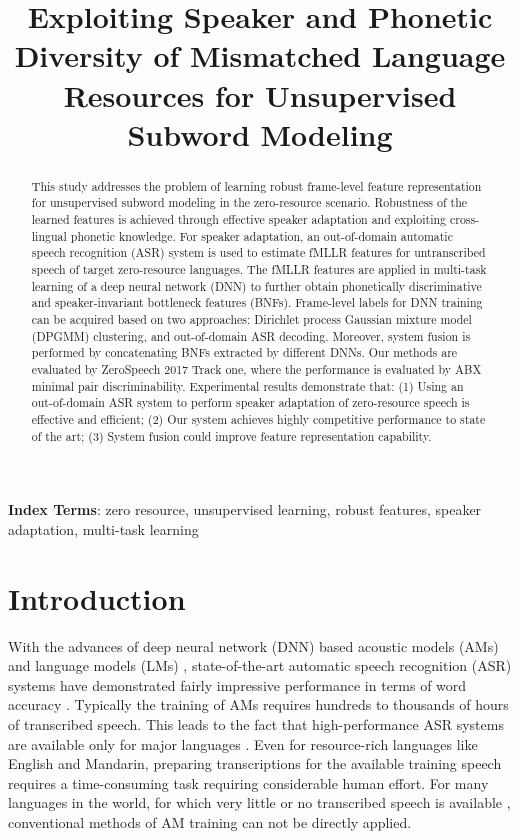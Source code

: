 \documentclass[a4paper]{article}
\title{Exploiting Speaker and Phonetic Diversity of Mismatched Language Resources for Unsupervised Subword Modeling}
\begin{document}
\maketitle
% 
\begin{abstract}
This study addresses the problem of learning robust frame-level feature representation for unsupervised subword modeling in the zero-resource scenario. Robustness of the learned features is achieved through effective speaker adaptation and exploiting cross-lingual phonetic knowledge. For speaker adaptation, an out-of-domain automatic speech recognition (ASR) system is used to estimate fMLLR features for untranscribed speech of target zero-resource languages. The fMLLR features  are applied in multi-task learning of a deep neural network (DNN) to further obtain phonetically discriminative and speaker-invariant bottleneck features (BNFs). Frame-level labels for DNN training can be acquired based on two approaches:  Dirichlet process Gaussian mixture model (DPGMM) clustering, and out-of-domain ASR decoding. Moreover, system fusion is performed by concatenating BNFs extracted by different DNNs. Our methods are evaluated by ZeroSpeech 2017 Track one, where the performance is evaluated by ABX minimal pair discriminability. Experimental results demonstrate that: (1) Using an out-of-domain ASR system to perform speaker adaptation of zero-resource speech is effective and efficient; (2) Our system achieves highly competitive performance to state of the art; (3) System fusion could improve feature representation capability.
\end{abstract}
\noindent\textbf{Index Terms}: zero resource, unsupervised learning, robust features, speaker adaptation, multi-task learning

\section{Introduction}
\label{sec:intro}
With the advances of deep neural network (DNN) based acoustic models (AMs) \cite{hinton2012deep} and language models (LMs) \cite{ragni2016multi}, state-of-the-art automatic speech recognition (ASR) systems have demonstrated fairly impressive performance in terms of word accuracy \cite{Saon2017,Hori2017}. Typically the training of AMs requires hundreds to thousands of hours of transcribed speech. This leads to the fact that high-performance ASR systems are available only for major languages \cite{shibata2017composite}. Even for resource-rich languages like English and Mandarin, preparing transcriptions for the available training speech requires a time-consuming task requiring considerable human effort. For many languages in the world, for which very little or no transcribed speech is available \cite{dunbar2017zero}, conventional methods of AM training can not be directly applied.
\end{document}
